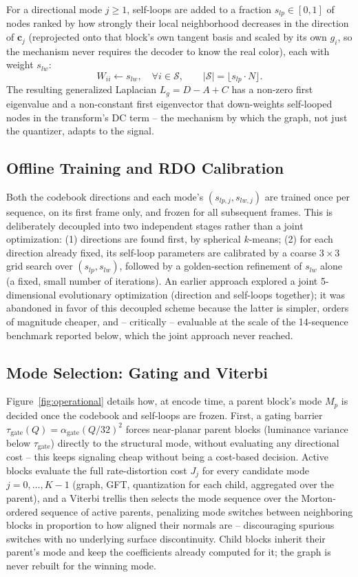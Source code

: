 \documentclass[conference]{IEEEtran}
\begin{document}
For a directional mode $j\ge1$, self-loops are added to a fraction $s_{lp}\in[0,1]$ of nodes
ranked by how strongly their local neighborhood decreases in the direction of $\mathbf{c}_j$
(reprojected onto that block's own tangent basis and scaled by its own $g_i$, so the mechanism
never requires the decoder to know the real color), each with weight $s_{lw}$:
\begin{equation}
    W_{ii} \leftarrow s_{lw}, \quad \forall i \in \mathcal{S}, \qquad
    |\mathcal{S}| = \lfloor s_{lp}\cdot N\rfloor .
\end{equation}
The resulting generalized Laplacian $L_g = D - A + C$ has a non-zero first eigenvalue and a
non-constant first eigenvector that down-weights self-looped nodes in the transform's DC term
-- the mechanism by which the graph, not just the quantizer, adapts to the signal.

\subsection{Offline Training and RDO Calibration}
Both the codebook directions and each mode's $(s_{lp,j}, s_{lw,j})$ are trained once per
sequence, on its first frame only, and frozen for all subsequent frames. This is deliberately
decoupled into two independent stages rather than a joint optimization: (1) directions are
found first, by spherical $k$-means; (2) for each direction already fixed, its self-loop
parameters are calibrated by a coarse $3\times3$ grid search over $(s_{lp},s_{lw})$, followed by
a golden-section refinement of $s_{lw}$ alone (a fixed, small number of iterations). An earlier
approach explored a joint 5-dimensional evolutionary optimization (direction and self-loops
together); it was abandoned in favor of this decoupled scheme because the latter is simpler,
orders of magnitude cheaper, and -- critically -- evaluable at the scale of the 14-sequence
benchmark reported below, which the joint approach never reached.

\subsection{Mode Selection: Gating and Viterbi}
\label{sec:mode-selection}
Figure~\ref{fig:operational} details how, at encode time, a parent block's mode $M_p$ is
decided once the codebook and self-loops are frozen. First, a gating barrier
$\tau_{\text{gate}}(Q)=\alpha_{\text{gate}}(Q/32)^2$ forces near-planar parent blocks
(luminance variance below $\tau_{\text{gate}}$) directly to the structural mode, without
evaluating any directional cost -- this keeps signaling cheap without being a cost-based
decision. Active blocks evaluate the full rate-distortion cost $J_j$ for every candidate mode
$j=0,\dots,K-1$ (graph, GFT, quantization for each child, aggregated over the parent), and a
Viterbi trellis then selects the mode sequence over the Morton-ordered sequence of active
parents, penalizing mode switches between neighboring blocks in proportion to how aligned their
normals are -- discouraging spurious switches with no underlying surface discontinuity. Child
blocks inherit their parent's mode and keep the coefficients already computed for it; the graph
is never rebuilt for the winning mode.
\end{document}
